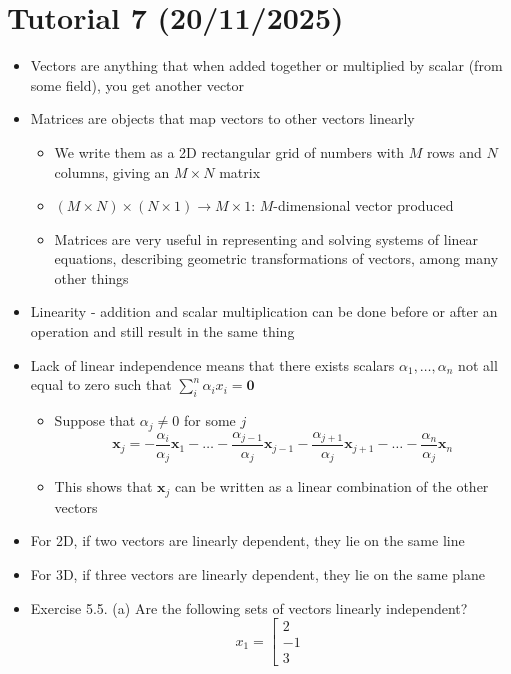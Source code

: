 \documentclass{article}
\begin{document}
\section{Tutorial 7 (20/11/2025)}
\begin{itemize}
    \item Vectors are anything that when added together or multiplied by scalar (from some field), you get another vector
    \item Matrices are objects that map vectors to other vectors linearly
    \begin{itemize}
        \item We write them as a 2D rectangular grid of numbers with $M$ rows and $N$ columns, giving an $M \times N$ matrix
        \item $(M \times N) \times (N \times 1) \rightarrow M \times 1$: $M$-dimensional vector produced
        \item Matrices are very useful in representing and solving systems of linear equations, describing geometric transformations of vectors, among many other things
    \end{itemize}
    \item Linearity - addition and scalar multiplication can be done before or after an operation and still result in the same thing
    \item Lack of linear independence means that there exists scalars $\alpha_1,\dots,\alpha_n$ not all equal to zero such that $\sum_{i}^n \alpha_ix_i = \bm{0}$
    \begin{itemize}
        \item Suppose that $\alpha_j \neq 0$ for some $j$
        \[
        \bm{x}_j = -\frac{\alpha_i}{\alpha_j} \bm{x}_1 - \dots - \frac{\alpha_{j-1}}{\alpha_j} \bm{x}_{j-1} - \frac{\alpha_{j+1}}{\alpha_j} \bm{x}_{j+1} -\dots - \frac{\alpha_n}{\alpha_j} \bm{x}_n
        \]
        \item This shows that $\bm{x}_j$ can be written as a linear combination of the other vectors
    \end{itemize}
    \item For 2D, if two vectors are linearly dependent, they lie on the same line
    \item For 3D, if three vectors are linearly dependent, they lie on the same plane
    \item Exercise 5.5. (a) Are the following sets of vectors linearly independent?
    \[
    x_1 = \left[ \begin{array}{c}
        2 \\ -1 \\ 3

\end{array}\]
\end{itemize}
\end{document}
